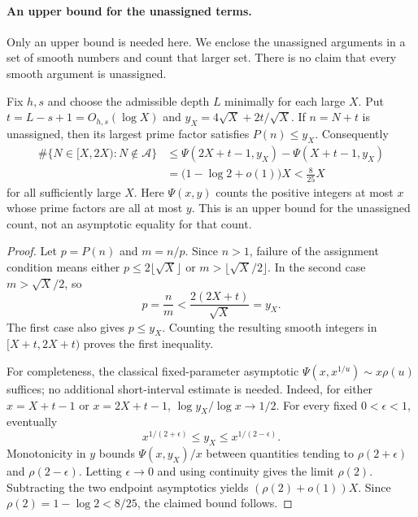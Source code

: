 \paragraph{An upper bound for the unassigned terms.}
Only an upper bound is needed here. We enclose the unassigned
arguments in a set of smooth numbers and count that larger set.
There is no claim that every smooth argument is unassigned.

\begin{prop}\label{prop:dickman}
Fix $h,s$ and choose the admissible depth $L$ minimally for each large $X$.
Put $t=L-s+1=O_{h,s}(\log X)$ and $y_X=4\sqrt X+2t/\sqrt X$.
If $n=N+t$ is unassigned, then its largest prime factor satisfies
$P(n)\le y_X$. Consequently
\[
\begin{aligned}
 \#\{N\in[X,2X):N\notin\mathcal A\}
 &\le \Psi(2X+t-1,y_X)-\Psi(X+t-1,y_X)\\
 &=\bigl(1-\log2+o(1)\bigr)X<\tfrac8{25}X
\end{aligned}
\]
for all sufficiently large $X$. Here $\Psi(x,y)$ counts the positive
integers at most $x$ whose prime factors are all at most $y$.
This is an upper bound for the unassigned count, not an asymptotic equality
for that count.
\end{prop}

\begin{proof}
Let $p=P(n)$ and $m=n/p$. Since $n>1$, failure of the assignment condition
means either $p\le2\lfloor\sqrt X\rfloor$ or
$m>\lfloor\sqrt X/2\rfloor$. In the second case $m>\sqrt X/2$, so
\[
 p=\frac{n}{m}<\frac{2(2X+t)}{\sqrt X}=y_X.
\]
The first case also gives $p\le y_X$. Counting the resulting smooth
integers in $[X+t,2X+t)$ proves the first inequality.

For completeness, the classical fixed-parameter asymptotic
$\Psi(x,x^{1/u})\sim x\rho(u)$ suffices; no additional short-interval
estimate is needed. Indeed, for either $x=X+t-1$ or $x=2X+t-1$,
$\log y_X/\log x\to1/2$. For every fixed $0<\epsilon<1$, eventually
\[
 x^{1/(2+\epsilon)}\le y_X\le x^{1/(2-\epsilon)}.
\]
Monotonicity in $y$ bounds $\Psi(x,y_X)/x$ between quantities tending to
$\rho(2+\epsilon)$ and $\rho(2-\epsilon)$. Letting $\epsilon\to0$ and
using continuity gives the limit $\rho(2)$. Subtracting the two endpoint
asymptotics yields $(\rho(2)+o(1))X$. Since $\rho(2)=1-\log2<8/25$,
the claimed bound follows.
\end{proof}

